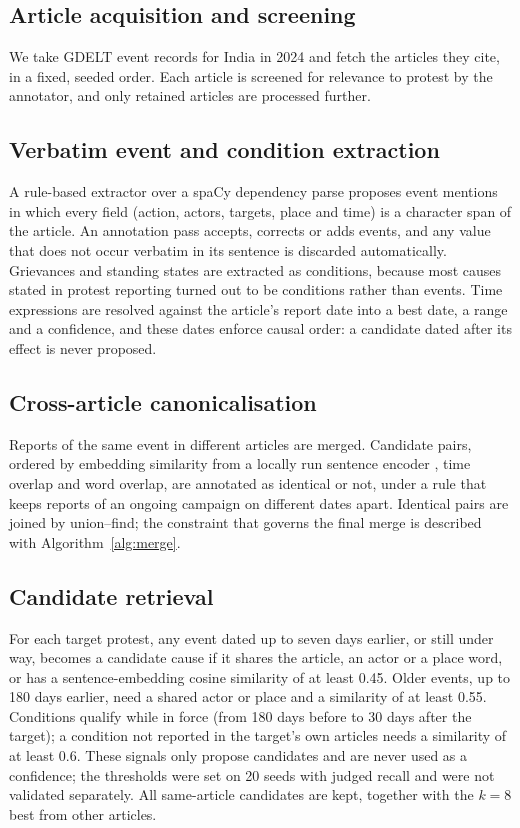 \documentclass[pdflatex,sn-basic,lineno]{sn-jnl}
\theoremstyle{thmstylethree}
\theoremstyle{thmstyleone}
\begin{document}
\subsection{Article acquisition and screening}
We take GDELT event records for India in 2024 and fetch the articles they cite, in a fixed,
seeded order. Each article is screened for relevance to protest by the annotator, and only
retained articles are processed further.

\subsection{Verbatim event and condition extraction}
A rule-based extractor over a spaCy dependency parse \citep{spacy} proposes event mentions in
which every field (action, actors, targets, place and time) is a character span of the article.
An annotation pass accepts, corrects or adds events, and any value that does not occur verbatim in
its sentence is discarded automatically. Grievances and standing states are extracted as
conditions, because most causes stated in protest reporting turned out to be conditions rather
than events. Time expressions are resolved against the article's report date into a best date, a
range and a confidence, and these dates enforce causal order: a candidate dated after its effect
is never proposed.

\subsection{Cross-article canonicalisation}
Reports of the same event in different articles are merged. Candidate pairs, ordered by embedding
similarity from a locally run sentence encoder \citep{sbert}, time overlap and word overlap, are
annotated as identical or not, under a rule that keeps reports of an ongoing campaign on different
dates apart. Identical pairs are joined by union--find; the constraint that governs the final
merge is described with Algorithm~\ref{alg:merge}.

\subsection{Candidate retrieval}
For each target protest, any event dated up to seven days earlier, or still under way, becomes a
candidate cause if it shares the article, an actor or a place word, or has a sentence-embedding
cosine similarity of at least 0.45. Older events, up to 180 days earlier, need a shared actor or
place and a similarity of at least 0.55. Conditions qualify while in force (from 180 days before
to 30 days after the target); a condition not reported in the target's own articles needs a
similarity of at least 0.6. These signals only propose candidates and are never used as a
confidence; the thresholds were set on 20 seeds with judged recall and were not validated
separately. All same-article candidates are kept, together with the $k=8$ best from other
articles.
\end{document}
